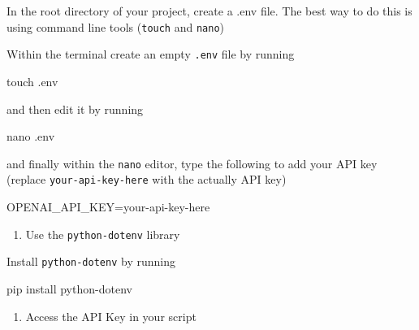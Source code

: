 \documentclass[
  letterpaper,
  DIV=11,
  numbers=noendperiod]{scrreprt}
\newenvironment{Shaded}{\begin{snugshade}}{\end{snugshade}}
\newcommand{\NormalTok}[1]{\textcolor[rgb]{0.00,0.23,0.31}{#1}}
\newcommand{\OperatorTok}[1]{\textcolor[rgb]{0.37,0.37,0.37}{#1}}
\newcommand{\OtherTok}[1]{\textcolor[rgb]{0.00,0.23,0.31}{#1}}
\newcommand{\SpecialCharTok}[1]{\textcolor[rgb]{0.37,0.37,0.37}{#1}}
\providecommand{\tightlist}{%
  \setlength{\itemsep}{0pt}\setlength{\parskip}{0pt}}\usepackage{longtable,booktabs,array}
\begin{document}
In the root directory of your project, create a .env file. The best way
to do this is using command line tools (\texttt{touch} and
\texttt{nano})

Within the terminal create an empty \texttt{.env} file by running

\begin{Shaded}
\begin{Highlighting}[]
\NormalTok{touch .env}
\end{Highlighting}
\end{Shaded}

and then edit it by running

\begin{Shaded}
\begin{Highlighting}[]
\NormalTok{nano .env}
\end{Highlighting}
\end{Shaded}

and finally within the \texttt{nano} editor, type the following to add
your API key (replace \texttt{your-api-key-here} with the actually API
key)

\begin{Shaded}
\begin{Highlighting}[]
\NormalTok{OPENAI\_API\_KEY}\OtherTok{=}\NormalTok{your}\SpecialCharTok{{-}}\NormalTok{api}\SpecialCharTok{{-}}\NormalTok{key}\SpecialCharTok{{-}}\NormalTok{here}
\end{Highlighting}
\end{Shaded}

\begin{enumerate}
\def\labelenumi{\arabic{enumi}.}
\setcounter{enumi}{1}
\tightlist
\item
  Use the \texttt{python-dotenv} library
\end{enumerate}

Install \texttt{python-dotenv} by running

\begin{Shaded}
\begin{Highlighting}[]
\NormalTok{pip install python}\OperatorTok{{-}}\NormalTok{dotenv}
\end{Highlighting}
\end{Shaded}

\begin{enumerate}
\def\labelenumi{\arabic{enumi}.}
\setcounter{enumi}{2}
\tightlist
\item
  Access the API Key in your script
\end{enumerate}
\end{document}
